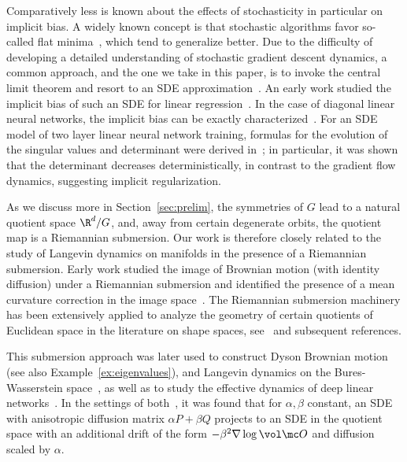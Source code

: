 \documentclass[twoside,a4paper,11pt]{article}
\theoremstyle{plain}
\begin{document}
Comparatively less is known about
the effects of stochasticity in particular on implicit bias.
A widely known concept is
that stochastic algorithms favor so-called flat minima~\cite{keskar2016large}, which tend to generalize
better.
Due to the difficulty of developing a detailed
understanding of stochastic
gradient descent dynamics, a
common approach, and the one we take
in this paper, is to invoke
the central limit theorem
and resort to an SDE approximation~\cite{cheng2020stochastic}.
An early work studied the implicit bias of
such an SDE for linear regression~\cite{ali2020implicit}.
In the case of diagonal linear
neural networks, the implicit bias can be
exactly characterized~\cite{pesme2021implicit,even2023s}.
For an SDE model of
two layer linear neural network training,
formulas for the evolution of the
singular values and determinant
were derived in~\cite{varre2024sgd};
in particular, it was shown
that the determinant decreases deterministically, in contrast
to the gradient flow dynamics, suggesting
implicit regularization.

As we discuss more in Section~\ref{sec:prelim},
the symmetries of $G$ lead to a
natural quotient space $\R^d/G$,
and, away from certain degenerate orbits,
the quotient map is a Riemannian submersion.
Our work is therefore closely related to the study
of Langevin dynamics on manifolds in the presence
of a Riemannian submersion. 
Early work studied the image of Brownian
motion (with identity diffusion)
under a Riemannian submersion and identified the presence of a mean curvature correction in the image space~\cite{pauwels1990riemannian,carne1990geometry}.
The Riemannian
submersion machinery has been
extensively applied to analyze
the geometry of certain quotients of Euclidean
space in the literature on shape spaces,
see~\cite{le1993riemannian} and subsequent references.

This submersion approach was 
later used to construct Dyson Brownian motion~\cite{huang2023motion}
(see also Example~\ref{ex:eigenvalues}),
and Langevin dynamics on the Bures-Wasserstein
space~\cite{yu2023riemannian},
as well as to study the effective dynamics of
deep linear networks~\cite{menon2024geometry}.
In the settings
of both~\cite{huang2023motion,menon2024geometry}, it was found that
for $\alpha, \beta$ constant,
an SDE with anisotropic diffusion matrix $\alpha P + \beta Q$
projects to an SDE in the quotient space
with an additional drift of the form $-\beta^2\nabla \log \vol \mc O$
and diffusion scaled by $\alpha$.
\end{document}
